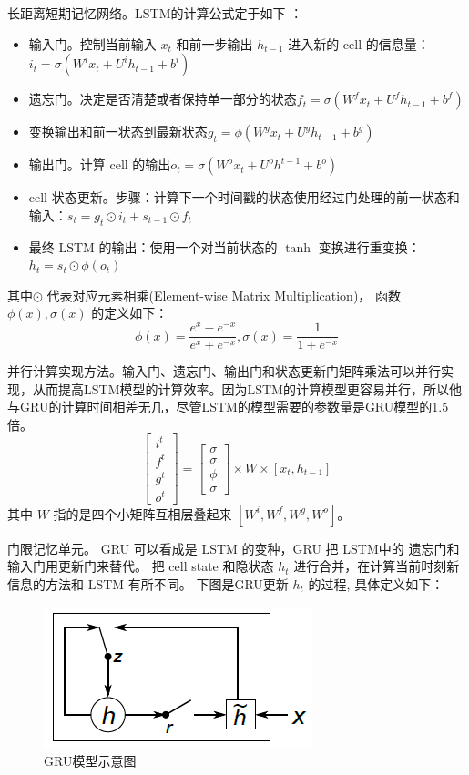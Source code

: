 {长距离短期记忆网络}。LSTM的计算公式定于如下 ：
\begin{itemize}
\item 输入门。控制当前输入 $x_t$ 和前一步输出 $h_{t−1}$ 进入新的 cell 的信息量：$i_t=\sigma(W^i x_t+U^i h_{t-1}+b^i)$
\item  遗忘门。决定是否清楚或者保持单一部分的状态$f_t=\sigma(W^f x_t+U^f h_{t-1}+b^f)$
\item  变换输出和前一状态到最新状态$g_t=\phi(W^g x_t+U^g h_{t-1}+b^g)$
\item  输出门。计算 cell 的输出$o_t=\sigma(W^o x_t+U^o h^{t-1}+b^o)$
\item  cell 状态更新。步骤：计算下一个时间戳的状态使用经过门处理的前一状态和输入：$s_t=g_t\odot i_t+s_{t-1}\odot f_t$
\item 最终 LSTM 的输出：使用一个对当前状态的 $\tanh$ 变换进行重变换：$h_t=s_t\odot \phi(o_t)$
\end{itemize}
\noindent 其中$\odot$ 代表对应元素相乘(Element-wise Matrix Multiplication)， 函数 $\phi(x), \sigma(x)$ 的定义如下：
\begin{equation}\label{equ:tanh}
  \phi(x)=\frac{e^x-e^{-x}}{e^x+e^{-x}},\sigma(x)=\frac{1}{1+e^{-x}}
\end{equation}

{并行计算实现方法}。输入门、遗忘门、输出门和状态更新门矩阵乘法可以并行实现，从而提高LSTM模型的计算效率。因为LSTM的计算模型更容易并行，所以他与GRU的计算时间相差无几，尽管LSTM的模型需要的参数量是GRU模型的1.5倍。
\begin{equation}\label{equ:lstm}
\begin{bmatrix} i^t\\ f^t\\g^t\\o^t \end{bmatrix} =\begin{bmatrix}\sigma\\ \sigma\\\phi\\\sigma\end{bmatrix}\times W\times[x_t,h_{t-1}]
\end{equation}
其中 $W$ 指的是四个小矩阵互相层叠起来 $[W^i,W^f,W^g,W^o]$。




{门限记忆单元。} GRU 可以看成是 LSTM 的变种，GRU 把 LSTM中的 遗忘门和输入门用更新门来替代。 把 cell state 和隐状态 $h_t$ 进行合并，在计算当前时刻新信息的方法和 LSTM 有所不同。 下图是GRU更新 $h_t$ 的过程, 具体定义如下：
\begin{figure}[!h]
  \centering
  \includegraphics[width=0.45\linewidth]{./figures/gru.png}
  \caption{GRU模型示意图}\label{fig:gru}
\end{figure}

